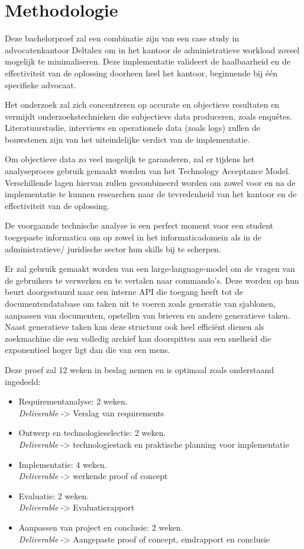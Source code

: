 \section{Methodologie}%
\label{sec:methodologie}
Deze bachelorproef zal een combinatie zijn van een case study in advocatenkantoor Deltalex om in het kantoor de 
administratieve workload zoveel mogelijk te minimaliseren. 
Deze implementatie valideert de haalbaarheid en de effectiviteit van de oplossing doorheen heel het kantoor, 
beginnende bij één specifieke advocaat.

Het onderzoek zal zich concentreren op accurate en objectieve resultaten en vermijdt onderzoekstechnieken die 
subjectieve data produceren, zoals enquêtes. Literatuurstudie, interviews en operationele data (zoals logs) zullen de 
bouwstenen zijn van het uiteindelijke verdict van de implementatie.

Om objectieve data zo veel mogelijk te garanderen, zal er tijdens het analyseproces gebruik gemaakt worden van het 
Technology Acceptance Model. 
Verschillende lagen hiervan zullen gecombineerd worden om zowel voor en na de implementatie te kunnen 
researchen naar de tevredenheid van het kantoor en de effectiviteit van de oplossing. 

De voorgaande technische analyse is een perfect moment voor een student toegepaste informatica om op zowel in het 
informaticadomein als in de administratieve/ juridische sector hun skills bij te scherpen.

Er zal gebruik gemaakt worden van een large-language-model om de vragen van de gebruikers te verwerken en te 
vertalen naar commando's. 
Deze worden op hun beurt doorgestuurd naar een interne API die toegang heeft tot de documentendatabase om taken uit 
te voeren zoals generatie van sjablonen, aanpassen van documenten, opstellen van brieven en andere generatieve taken. 
Naast generatieve taken kan deze structuur ook heel efficiënt dienen als zoekmachine die een volledig 
archief kan doorspitten aan een snelheid die exponentieel hoger ligt dan die van een mens.

Deze proef zal 12 weken in beslag nemen en is optimaal zoals onderstaand ingedeeld:
\begin{itemize}
	\item Requirementanalyse: 2 weken.\\ \emph{Deliverable} -> Verslag van requirements
	\item Ontwerp en technologieselectie: 2 weken.\\ \emph{Deliverable} -> technologiestack en praktische planning voor implementatie
	\item Implementatie: 4 weken.\\ \emph{Deliverable} -> werkende proof of concept
	\item Evaluatie: 2 weken. \\ \emph{Deliverable} -> Evaluatierapport
	\item Aanpassen van project en conclusie: 2 weken.\\ \emph{Deliverable} -> Aangepaste proof of concept, eindrapport en conclusie
\end{itemize}

